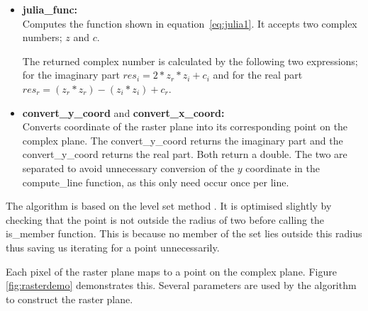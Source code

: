 \begin{itemize}
\item \textbf{julia\_func:} \\
            Computes the function shown in equation~\ref{eq:julia1}. It accepts two complex numbers; \(z\) and \(c\).
            
            The returned complex number is calculated by the following two expressions;
            for the imaginary part \(res_i = 2 * z_r * z_i + c_i\) and for the real part \(res_r = (z_r * z_r) - (z_i * z_i) + c_r\).

\item \textbf{convert\_y\_coord} and \textbf{convert\_x\_coord:} \\
            Converts coordinate of the raster plane into its corresponding point on the complex plane.
            The convert\_y\_coord returns the imaginary part and the convert\_y\_coord returns the real part.
            Both return a double.
            The two are separated to avoid unnecessary conversion of the \(y\) coordinate in the compute\_line function,
            as this only need occur once per line.
\end{itemize}

The algorithm is based on the level set method \cite[p.~188]{fractimg}.
It is optimised slightly by checking that the point is not outside the radius of two before 
calling the is\_member function. This is because no member of the set lies outside this radius
thus saving us iterating for a point unnecessarily.  



Each pixel of the raster plane maps to a point on the complex plane. Figure \ref{fig:rasterdemo} demonstrates
this. Several parameters are used by the algorithm to construct the raster plane.

